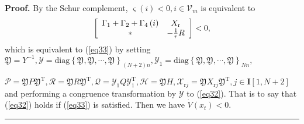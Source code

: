 \documentclass[9pt]{article}%
\newenvironment{proof}[1][Proof]{\noindent \textbf{#1.} }{\  \rule{0.5em}{0.5em}}
\begin{document}
\begin{proof}
By the Schur complement, $\varsigma \left(  i\right)  <0,i\in \mathcal{V}_{m}$
is equivalent to%
\begin{equation}
\left[
\begin{array}
[c]{cc}%
\Gamma_{1}+\Gamma_{2}+\Gamma_{4}\left(  i\right)  & X_{\mathrm{r}}\\
\ast & -\frac{1}{r}R
\end{array}
\right]  <0, \label{eq32}%
\end{equation}
which is equivalent to (\ref{eq33}) by setting $\mathfrak{Y}\mathfrak{=}%
Y^{-1},\mathcal{Y}\mathcal{=}\mathrm{diag}\left \{  \mathfrak{Y,Y,\cdots
,Y}\right \}  _{\left(  N+2\right)  n},\mathcal{Y}_{1}\mathcal{=}%
\mathrm{diag}\left \{  \mathfrak{Y,Y,\cdots,Y}\right \}  _{Nn},$

$\mathcal{P}\mathcal{=}\mathfrak{Y}P\mathfrak{Y}^{\mathrm{T}},\mathcal{R=}%
\mathfrak{Y}R\mathfrak{Y}^{\mathrm{T}},\mathcal{Q}=\mathcal{Y}_{1}%
Q\mathcal{Y}_{1}^{\mathrm{T}},\mathcal{H}=\mathfrak{Y}H,\mathcal{X}%
_{\mathrm{r}j}=\mathfrak{Y}X_{\mathrm{r}j}\mathfrak{Y}^{\mathrm{T}}%
,j\in \mathbf{I}\left[  1,N+2\right]  $ and performing a congruence
transformation by $\mathcal{Y}$ to (\ref{eq32}). That is to say that
(\ref{eq32}) holds if (\ref{eq33}) is satisfied. Then we have $\dot{V}\left(
x_{t}\right)  <0.$
\end{proof}
\end{document}
